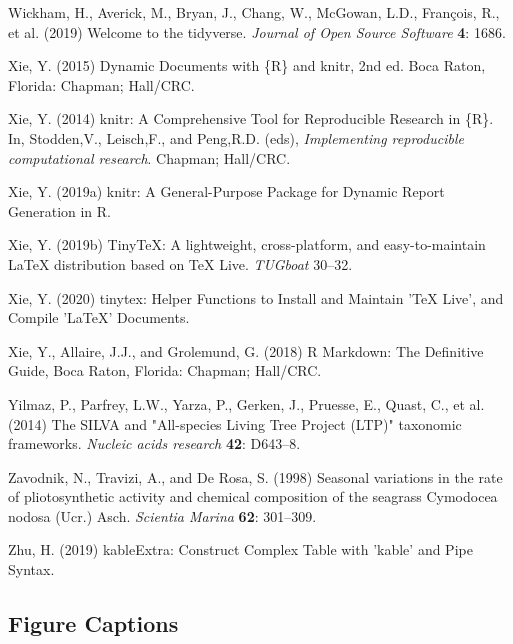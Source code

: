 \documentclass[12pt,]{article}
\begin{document}
\leavevmode\hypertarget{ref-Wickham2019}{}%
Wickham, H., Averick, M., Bryan, J., Chang, W., McGowan, L.D., François,
R., et al. (2019) Welcome to the tidyverse. \emph{Journal of Open Source
Software} \textbf{4}: 1686.

\leavevmode\hypertarget{ref-Xie2015}{}%
Xie, Y. (2015) Dynamic Documents with \{R\} and knitr, 2nd ed. Boca
Raton, Florida: Chapman; Hall/CRC.

\leavevmode\hypertarget{ref-Xie2014}{}%
Xie, Y. (2014) knitr: A Comprehensive Tool for Reproducible Research in
\{R\}. In, Stodden,V., Leisch,F., and Peng,R.D. (eds),
\emph{Implementing reproducible computational research}. Chapman;
Hall/CRC.

\leavevmode\hypertarget{ref-Xie2019a}{}%
Xie, Y. (2019a) knitr: A General-Purpose Package for Dynamic Report
Generation in R.

\leavevmode\hypertarget{ref-Xie2019}{}%
Xie, Y. (2019b) TinyTeX: A lightweight, cross-platform, and
easy-to-maintain LaTeX distribution based on TeX Live. \emph{TUGboat}
30--32.

\leavevmode\hypertarget{ref-Xie2020}{}%
Xie, Y. (2020) tinytex: Helper Functions to Install and Maintain 'TeX
Live', and Compile 'LaTeX' Documents.

\leavevmode\hypertarget{ref-Xie2018}{}%
Xie, Y., Allaire, J.J., and Grolemund, G. (2018) R Markdown: The
Definitive Guide, Boca Raton, Florida: Chapman; Hall/CRC.

\leavevmode\hypertarget{ref-Yilmaz2014}{}%
Yilmaz, P., Parfrey, L.W., Yarza, P., Gerken, J., Pruesse, E., Quast,
C., et al. (2014) The SILVA and "All-species Living Tree Project (LTP)"
taxonomic frameworks. \emph{Nucleic acids research} \textbf{42}:
D643--8.

\leavevmode\hypertarget{ref-Zavodnik1998}{}%
Zavodnik, N., Travizi, A., and De Rosa, S. (1998) Seasonal variations in
the rate of pliotosynthetic activity and chemical composition of the
seagrass Cymodocea nodosa (Ucr.) Asch. \emph{Scientia Marina}
\textbf{62}: 301--309.

\leavevmode\hypertarget{ref-Zhu2019}{}%
Zhu, H. (2019) kableExtra: Construct Complex Table with 'kable' and Pipe
Syntax.

\newpage 
\setlength\parindent{0pt}

\hypertarget{figure-captions}{%
\subsection{Figure Captions}\label{figure-captions}}
\end{document}

